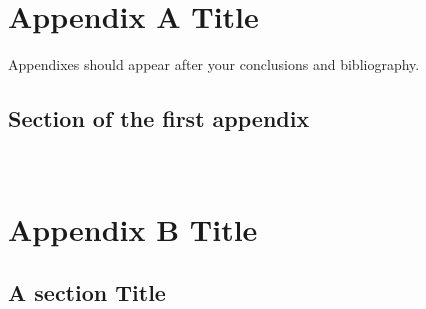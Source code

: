 \documentclass[11pt]{report}
\numberwithin{equation}{chapter}		%
\numberwithin{figure}{chapter}			%
\numberwithin{table}{chapter}			%
\begin{document}
	\newpage
	\thispagestyle{empty} \ \newpage
	\printbibliography[title=References]

	\newpage
	\thispagestyle{empty} \ \newpage

	\appendix
	\chapter{Appendix A Title}
	Appendixes should appear after your conclusions and bibliography.
	\section{Section of the first appendix}
	\lipsum[3]


	\newpage
	\thispagestyle{empty} \ \newpage
	\chapter{Appendix B Title}
	\lipsum[2]

	\section{A section Title}
	\lipsum[3]
\end{document}
